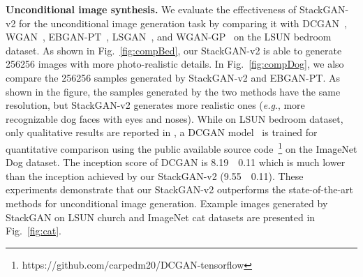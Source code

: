 \documentclass[10pt,journal,letterpaper,compsoc]{IEEEtran}
\begin{document}
\textbf{Unconditional image synthesis.} 
{
We evaluate the effectiveness of StackGAN-v2 for the unconditional image generation task by comparing it with DCGAN~\cite{Radford15}, WGAN~\cite{Martin17WGAN}, EBGAN-PT~\cite{Zhao2016}, LSGAN~\cite{Mao2016}, and WGAN-GP~\cite{GulrajaniAADC17} on the LSUN bedroom dataset. As shown in Fig.~\ref{fig:compBed}, our StackGAN-v2 is able to generate 256256 images with more photo-realistic details. In Fig.~\ref{fig:compDog}, we also compare the 256256 samples generated by StackGAN-v2 and EBGAN-PT. As shown in the figure, the samples generated by the two methods have the same resolution, but StackGAN-v2 generates more realistic ones (\emph{e.g}., more recognizable dog faces with eyes and noses). While on LSUN bedroom dataset, only qualitative results are reported in \cite{Radford15,Martin17WGAN,Zhao2016,Mao2016, GulrajaniAADC17}, a DCGAN model~\cite{Radford15} is trained for quantitative comparison using the public available source code~\footnote{https://github.com/carpedm20/DCGAN-tensorflow} on the ImageNet Dog dataset. The inception score of DCGAN is 8.19~~0.11 which is much lower than the inception achieved by our StackGAN-v2 (9.55~~0.11). These experiments demonstrate that our StackGAN-v2 outperforms the state-of-the-art methods for unconditional image generation.  Example images generated by StackGAN on LSUN church and ImageNet cat datasets are presented in Fig.~\ref{fig:cat}. 
}
\end{document}
